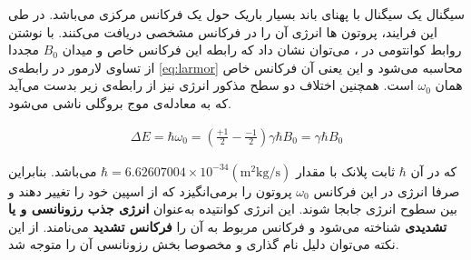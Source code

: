 \begin{figure}
	\centering
	\hfill
	\caption{}
	\label{fig:rotating-axis}
\end{figure}


سیگنال  یک سیگنال با پهنای باند بسیار باریک حول یک فرکانس مرکزی می‌باشد. در طی این فرایند، پروتون ها انرژی آن را در فرکانس مشخصی دریافت می‌کنند. با نوشتن روابط کوانتومی در 
 \cite{McRobbie}، 
 می‌توان نشان داد که رابطه این فرکانس خاص و میدان $B_0$ مجددا از تساوی لارمور در رابطه‌ی 
 \ref{eq:larmor}
  محاسبه می‌شود و این یعنی آن فرکانس خاص همان $\omega_0$ است. همچنین اختلاف دو سطح مذکور انرژی نیز از رابطه‌ی زیر بدست می‌آید که به معادله‌ی موج بروگلی
   ناشی می‌شود.
  
  \removevspace
  \begin{align}
  	\Delta E = \hbar \omega_0 = (\frac{+1}2 - \frac{-1}2) \gamma \hbar B_0 = \gamma\hbar B_0
  \end{align}

که در آن $\hbar$ ثابت پلانک
با مقدار 
$\hbar = 6.62607004 \times 10^{-34} (\mathrm{m}^2 \mathrm{kg} / \mathrm{s})$
می‌باشد. بنابراین صرفا انرژی در این فرکانس $\omega_0$ پروتون را برمی‌انگیزد که از اسپین خود را تغییر دهند و بین سطوح انرژی جابجا شوند.
این انرژی کوانتیده به‌عنوان \textbf{انرژی جذب رزونانسی و یا تشدیدی}
شناخته می‌شود و فرکانس مربوط به آن را \textbf{فرکانس تشدید}
می‌نامند. از این نکته می‌توان دلیل نام گذاری \mri و مخصوصا بخش رزونانسی آن را متوجه شد.



